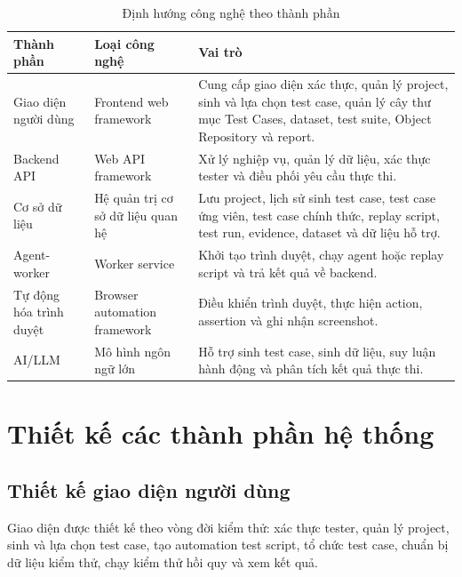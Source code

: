 \begin{table}[H]
\centering
\caption{Định hướng công nghệ theo thành phần}
\label{tab:chapter4_technology_components}
\renewcommand{\arraystretch}{1.2}
\begin{tabular}{|p{4.0cm}|p{4.2cm}|p{6.0cm}|}
\hline
\textbf{Thành phần} &
\textbf{Loại công nghệ} &
\textbf{Vai trò} \\
\hline

Giao diện người dùng &
Frontend web framework &
Cung cấp giao diện xác thực, quản lý project, sinh và lựa chọn test case, quản lý cây thư mục Test Cases, dataset, test suite, Object Repository và report. \\
\hline

Backend API &
Web API framework &
Xử lý nghiệp vụ, quản lý dữ liệu, xác thực tester và điều phối yêu cầu thực thi. \\
\hline

Cơ sở dữ liệu &
Hệ quản trị cơ sở dữ liệu quan hệ &
Lưu project, lịch sử sinh test case, test case ứng viên, test case chính thức, replay script, test run, evidence, dataset và dữ liệu hỗ trợ. \\
\hline

Agent-worker &
Worker service &
Khởi tạo trình duyệt, chạy agent hoặc replay script và trả kết quả về backend. \\
\hline

Tự động hóa trình duyệt &
Browser automation framework &
Điều khiển trình duyệt, thực hiện action, assertion và ghi nhận screenshot. \\
\hline

AI/LLM &
Mô hình ngôn ngữ lớn &
Hỗ trợ sinh test case, sinh dữ liệu, suy luận hành động và phân tích kết quả thực thi. \\
\hline
\end{tabular}
\end{table}

\section{Thiết kế các thành phần hệ thống}

\subsection{Thiết kế giao diện người dùng}

Giao diện được thiết kế theo vòng đời kiểm thử: xác thực tester, quản lý project, sinh và lựa chọn test case, tạo automation test script, tổ chức test case, chuẩn bị dữ liệu kiểm thử, chạy kiểm thử hồi quy và xem kết quả.

